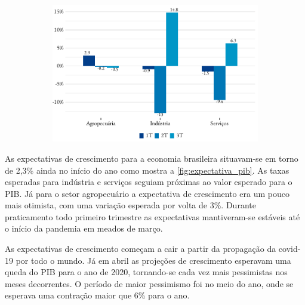 \begin{figure}[!h]
\begin{subfigure}{\linewidth}
		\includegraphics{fig/pib_oferta.pdf}
	\end{subfigure}
\end{figure}
\par As expectativas de crescimento para a economia brasileira situavam-se em torno de 2,3\% ainda no início do ano como mostra a \ref{fig:expectativa_pib}. As taxas esperadas para indústria e serviços seguiam próximas ao valor esperado para o PIB. Já para o setor agropecuário a expectativa de crescimento era um pouco mais otimista, com uma variação esperada por volta de 3\%. Durante praticamento todo primeiro trimestre as expectativas mantiveram-se estáveis até o início da pandemia em meados de março.
\par As expectativas de crescimento começam a cair a partir da propagação da covid-19 por todo o mundo. Já em abril as projeções de crescimento esperavam uma queda do PIB para o ano de 2020, tornando-se cada vez mais pessimistas nos meses decorrentes. O período de maior pessimismo foi no meio do ano, onde se esperava uma contração maior que 6\% para o ano. 
